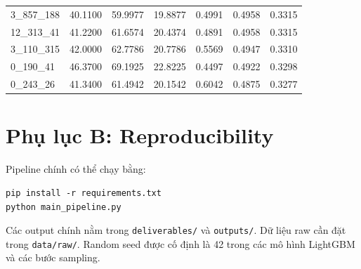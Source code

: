 \begin{table}[H]
{\begin{tabular}{lllllll}
3\_857\_188 & 40.1100 & 59.9977 & 19.8877 & 0.4991 & 0.4958 & 0.3315 \\
12\_313\_41 & 41.2200 & 61.6574 & 20.4374 & 0.4891 & 0.4958 & 0.3315 \\
3\_110\_315 & 42.0000 & 62.7786 & 20.7786 & 0.5569 & 0.4947 & 0.3310 \\
0\_190\_41 & 46.3700 & 69.1925 & 22.8225 & 0.4497 & 0.4922 & 0.3298 \\
0\_243\_26 & 41.3400 & 61.4942 & 20.1542 & 0.6042 & 0.4875 & 0.3277 \\
\bottomrule
\end{tabular}
}
\end{table}



\begin{table}[H]
\centering
\caption{Diagnostics phụ trên non-overlapping target}
\label{tab:app-nonoverlap}
\end{table}


\section{Phụ lục B: Reproducibility}

Pipeline chính có thể chạy bằng:

\begin{verbatim}
pip install -r requirements.txt
python main_pipeline.py
\end{verbatim}

Các output chính nằm trong \texttt{deliverables/} và \texttt{outputs/}. Dữ liệu raw cần đặt trong \texttt{data/raw/}. Random seed được cố định là 42 trong các mô hình LightGBM và các bước sampling.
